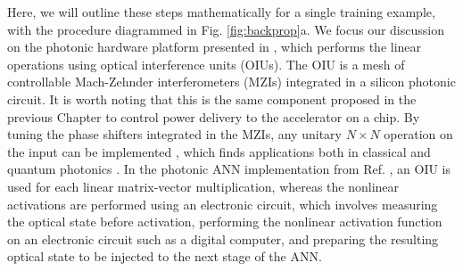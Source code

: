 Here, we will outline these steps mathematically for a single training example, with the procedure diagrammed in Fig. \ref{fig:backprop}a.  We focus our discussion on the photonic hardware platform presented in \cite{shen2017deep}, which performs the linear operations using optical interference units (OIUs).  The OIU is a mesh of controllable Mach-Zehnder interferometers (MZIs) integrated in a silicon photonic circuit. It is worth noting that this is the same component proposed in the previous Chapter to control power delivery to the accelerator on a chip.
By tuning the phase shifters integrated in the MZIs, any unitary $N \times N$ operation on the input can be implemented \cite{Reck1994,Clements2016}, which finds applications both in classical and quantum photonics \cite{Carolan2015, Harris2017}.  In the photonic ANN implementation from Ref. \cite{shen2017deep}, an OIU is used for each linear matrix-vector multiplication, whereas the nonlinear activations are performed using an electronic circuit, which involves measuring the optical state before activation, performing the nonlinear activation function on an electronic circuit such as a digital computer, and preparing the resulting optical state to be injected to the next stage of the ANN.

